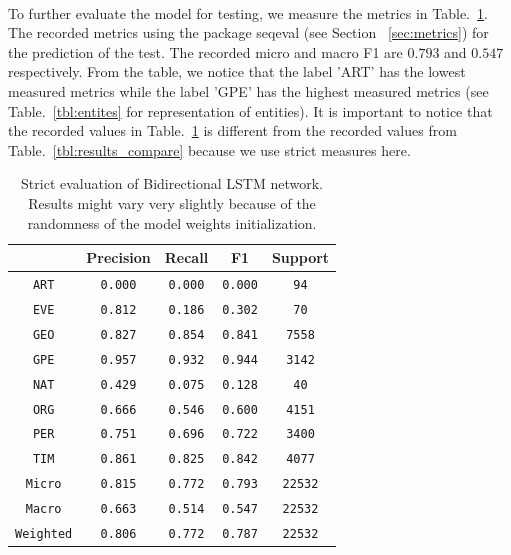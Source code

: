 \documentclass[sigconf, nonacm, natbib, screen, balance=False]{acmart}
\begin{document}
\hfill\\
To further evaluate the model for testing, we measure the metrics in Table.~\ref{tbl:lstm_results}. The recorded metrics using the package seqeval (see Section ~\ref{sec:metrics}) for the prediction of the test. The recorded micro and macro F1 are $0.793$ and $0.547$ respectively. From the table, we notice that the label 'ART' has the lowest measured metrics while the label 'GPE' has the highest measured metrics (see Table.~\ref{tbl:entites} for representation of entities). It is important to notice that the recorded values in Table.~\ref{tbl:lstm_results} is different from the recorded values from Table.~\ref{tbl:results_compare} because we use strict measures here.

\begin{table}
  \caption{Strict evaluation of Bidirectional LSTM network. Results might vary very slightly because of the randomness of the model weights initialization.}
  \label{tbl:lstm_results}
  \begin{tabular}{c|c|c|c|c}  
    \hline
    & Precision & Recall & F1 & Support \\\hline
    \verb!ART! & \verb!0.000! &  \verb!0.000! & \verb!0.000! & \verb!94! \\
    \verb!EVE! & \verb!0.812!  & \verb!0.186! & \verb!0.302! & \verb!70! \\
    \verb!GEO! & \verb!0.827!  & \verb!0.854! & \verb!0.841! & \verb!7558! \\
    \verb!GPE! & \verb!0.957!  & \verb!0.932! & \verb!0.944! & \verb!3142! \\
    \verb!NAT! & \verb!0.429!  & \verb!0.075! & \verb!0.128! & \verb!40! \\
    \verb!ORG! & \verb!0.666!  & \verb!0.546! & \verb!0.600! & \verb!4151! \\
    \verb!PER! & \verb!0.751!  & \verb!0.696! & \verb!0.722! & \verb!3400! \\
    \verb!TIM! & \verb!0.861!  & \verb!0.825! & \verb!0.842! & \verb!4077! \\\hline
    \verb!Micro! & \verb!0.815!  & \verb!0.772! & \verb!0.793! & \verb!22532! \\
    \verb!Macro! & \verb!0.663!  & \verb!0.514! & \verb!0.547! & \verb!22532! \\
    \verb!Weighted! & \verb!0.806!  & \verb!0.772! & \verb!0.787! & \verb!22532! \\\hline
  \end{tabular}
\end{table}
\end{document}
